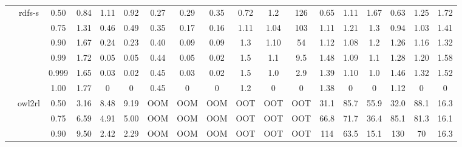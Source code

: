 \documentclass[sigconf,screen,review,natbib]{acmart}
\theoremstyle{definition}
\begin{document}
\begin{table}[!ht]
\begin{center}
\begin{tabular}{|c|c|c|c|c|c|c|c|c|c|c|c|c|c|c|c|c|c|}
			\cline{2-18}
			        & \multirow{6}{*}{rdfs-s} & 0.50  & 0.84                      & 1.11                          & 0.92                       & 0.27                           & 0.29                     & 0.35 & 0.72 & 1.2  & 126  & 0.65 & 1.11 & 1.67 & 0.63 & 1.25 & 1.72 \\
			        &                         & 0.75  & 1.31                      & 0.46                          & 0.49                       & 0.35                           & 0.17                     & 0.16 & 1.11 & 1.04 & 103  & 1.11 & 1.21 & 1.3  & 0.94 & 1.03 & 1.41 \\
			        &                         & 0.90  & 1.67                      & 0.24                          & 0.23                       & 0.40                           & 0.09                     & 0.09 & 1.3  & 1.10 & 54   & 1.12 & 1.08 & 1.2  & 1.26 & 1.16 & 1.32 \\
			        &                         & 0.99  & 1.72                      & 0.05                          & 0.05                       & 0.44                           & 0.05                     & 0.02 & 1.5  & 1.1  & 9.5  & 1.48 & 1.09 & 1.1  & 1.28 & 1.20 & 1.58 \\
			        &                         & 0.999 & 1.65                      & 0.03                          & 0.02                       & 0.45                           & 0.03                     & 0.02 & 1.5  & 1.0  & 2.9  & 1.39 & 1.10 & 1.0  & 1.46 & 1.32 & 1.52 \\
			        &                         & 1.00  & 1.77                      & 0                             & 0                          & 0.45                           & 0                        & 0    & 1.2  & 0    & 0    & 1.38 & 0    & 0    & 1.12 & 0    & 0    \\
			\cline{2-18}
			        & \multirow{6}{*}{owl2rl} & 0.50  & 3.16                      & 8.48                          & 9.19                       & OOM                            & OOM                      & OOM  & OOT  & OOT  & OOT  & 31.1 & 85.7 & 55.9 & 32.0 & 88.1 & 16.3 \\
			        &                         & 0.75  & 6.59                      & 4.91                          & 5.00                       & OOM                            & OOM                      & OOM  & OOT  & OOT  & OOT  & 66.8 & 71.7 & 36.4 & 85.1 & 81.3 & 16.1 \\
			        &                         & 0.90  & 9.50                      & 2.42                          & 2.29                       & OOM                            & OOM                      & OOM  & OOT  & OOT  & OOT  & 114  & 63.5 & 15.1 & 130  & 70   & 16.3 \\

\end{tabular}
\end{center}
\end{table}
\end{document}
